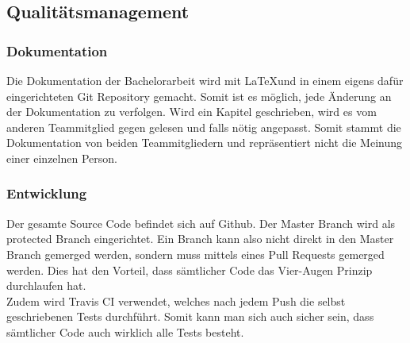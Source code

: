 \subsection{Qualitätsmanagement}

\subsubsection*{Dokumentation}
Die Dokumentation der Bachelorarbeit wird mit \LaTeX und in einem eigens dafür eingerichteten Git Repository gemacht. Somit ist es möglich, jede Änderung an der Dokumentation zu verfolgen. Wird ein Kapitel geschrieben, wird es vom anderen Teammitglied gegen gelesen und falls nötig angepasst. Somit stammt die Dokumentation von beiden Teammitgliedern und repräsentiert nicht die Meinung einer einzelnen Person. 


\subsubsection*{Entwicklung}
Der gesamte Source Code befindet sich auf Github. Der Master Branch wird als protected Branch eingerichtet. Ein Branch kann also nicht direkt in den Master Branch gemerged werden, sondern muss mittels eines Pull Requests gemerged werden. Dies hat den Vorteil, dass sämtlicher Code das Vier-Augen Prinzip durchlaufen hat. \\ 
Zudem wird Travis CI verwendet, welches nach jedem Push die selbst geschriebenen Tests durchführt. Somit kann man sich auch sicher sein, dass sämtlicher Code auch wirklich alle Tests besteht.

